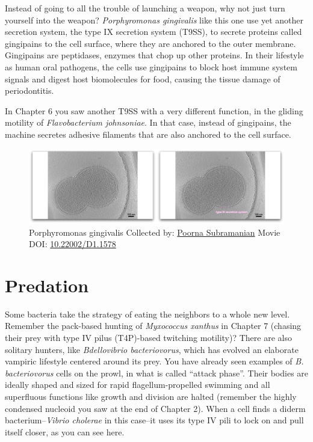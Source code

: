 \documentclass[]{tufte-book}
\begin{document}
Instead of going to all the trouble of launching a weapon, why not just
turn yourself into the weapon? \emph{Porphyromonas gingivalis} like this
one use yet another secretion system, the type IX secretion system
(T9SS), to secrete proteins called gingipains to the cell surface, where
they are anchored to the outer membrane. Gingipains are peptidases,
enzymes that chop up other proteins. In their lifestyle as human oral
pathogens, the cells use gingipains to block host immune system signals
and digest host biomolecules for food, causing the tissue damage of
periodontitis.

In Chapter 6 you saw another T9SS with a very different function, in the
gliding motility of \emph{Flavobacterium johnsoniae}. In that case,
instead of gingipains, the machine secretes adhesive filaments that are
also anchored to the cell surface.





\begin{figure}
\includegraphics{movie_stills/9_8} \caption[Porphyromonas gingivalis Collected by:
\protect\hyperlink{poorna_subramanian}{Poorna Subramanian} Movie DOI:
\href{https://doi.org/10.22002/D1.1578}{10.22002/D1.1578}]{Porphyromonas gingivalis Collected by:
\protect\hyperlink{poorna_subramanian}{Poorna Subramanian} Movie DOI:
\href{https://doi.org/10.22002/D1.1578}{10.22002/D1.1578}}\label{fig:9-8}
\end{figure}

\section{Predation}\label{predation}

Some bacteria take the strategy of eating the neighbors to a whole new
level. Remember the pack-based hunting of \emph{Myxococcus xanthus} in
Chapter 7 (chasing their prey with type IV pilus (T4P)-based twitching
motility)? There are also solitary hunters, like \emph{Bdellovibrio
bacteriovorus}, which has evolved an elaborate vampiric lifestyle
centered around its prey. You have already seen examples of \emph{B.
bacteriovorus} cells on the prowl, in what is called ``attack phase''.
Their bodies are ideally shaped and sized for rapid flagellum-propelled
swimming and all superfluous functions like growth and division are
halted (remember the highly condensed nucleoid you saw at the end of
Chapter 2). When a cell finds a diderm bacterium--\emph{Vibrio cholerae}
in this case--it uses its type IV pili to lock on and pull itself
closer, as you can see here.
\end{document}
